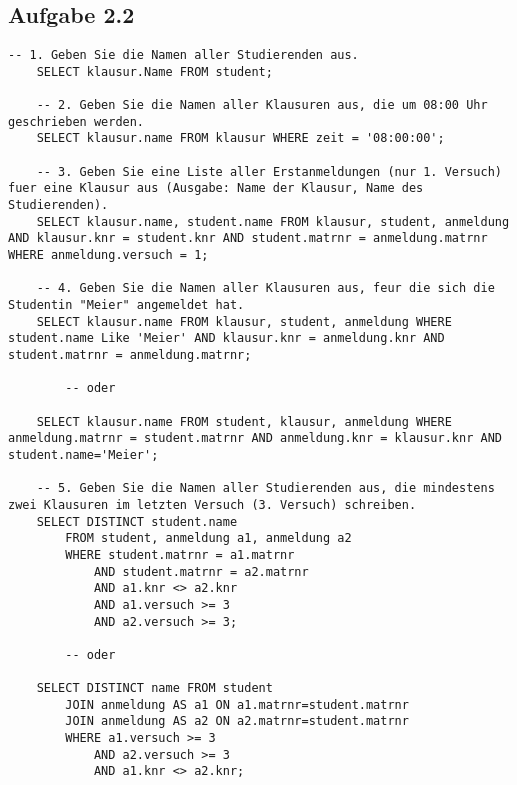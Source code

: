     \subsection{Aufgabe 2.2}
    \begin{lstlisting}[style=sqlstyle, caption={Einfügen von Datensätzen in die Tabellen STUDENT, KLAUSUR und ANMELDUNG}]
    -- 1. Geben Sie die Namen aller Studierenden aus.
    SELECT klausur.Name FROM student;
    
    -- 2. Geben Sie die Namen aller Klausuren aus, die um 08:00 Uhr geschrieben werden.
    SELECT klausur.name FROM klausur WHERE zeit = '08:00:00';

    -- 3. Geben Sie eine Liste aller Erstanmeldungen (nur 1. Versuch) fuer eine Klausur aus (Ausgabe: Name der Klausur, Name des Studierenden).
    SELECT klausur.name, student.name FROM klausur, student, anmeldung AND klausur.knr = student.knr AND student.matrnr = anmeldung.matrnr WHERE anmeldung.versuch = 1;

    -- 4. Geben Sie die Namen aller Klausuren aus, feur die sich die Studentin "Meier" angemeldet hat.
    SELECT klausur.name FROM klausur, student, anmeldung WHERE student.name Like 'Meier' AND klausur.knr = anmeldung.knr AND student.matrnr = anmeldung.matrnr;

        -- oder

    SELECT klausur.name FROM student, klausur, anmeldung WHERE anmeldung.matrnr = student.matrnr AND anmeldung.knr = klausur.knr AND student.name='Meier';

    -- 5. Geben Sie die Namen aller Studierenden aus, die mindestens zwei Klausuren im letzten Versuch (3. Versuch) schreiben.
    SELECT DISTINCT student.name
        FROM student, anmeldung a1, anmeldung a2
        WHERE student.matrnr = a1.matrnr
            AND student.matrnr = a2.matrnr
            AND a1.knr <> a2.knr
            AND a1.versuch >= 3
            AND a2.versuch >= 3;

        -- oder
        
    SELECT DISTINCT name FROM student
        JOIN anmeldung AS a1 ON a1.matrnr=student.matrnr
        JOIN anmeldung AS a2 ON a2.matrnr=student.matrnr
        WHERE a1.versuch >= 3
            AND a2.versuch >= 3
            AND a1.knr <> a2.knr;   
    \end{lstlisting}
    